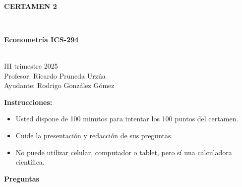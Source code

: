 \documentclass[10pt,a4paper]{article}
\begin{document}
\vspace{5cm}



\begin{center}
\begin{large}
\textbf{\\CERTAMEN 2}
\end{large}\\
\end{center}

\begin{center}
\begin{large}
\textbf{Econometría ICS-294}
\end{large}\\
\vspace{0.2cm}
III trimestre 2025\\
Profesor: Ricardo Pruneda Urzúa\\
Ayudante: Rodrigo González Gómez
\end{center}

\textbf{Instrucciones:} 

\begin{itemize}

    \item Usted dispone de 100 minutos  para intentar los 100 puntos del certamen.
    \item Cuide la presentación y redacción de sus preguntas.
    \item No puede utilizar celular, computador o tablet, pero sí una calculadora científica.
     
\end{itemize}

\textbf{Preguntas}
\end{document}
